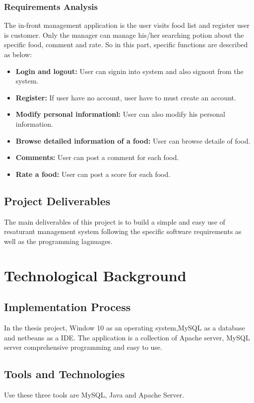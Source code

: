 \documentclass[12pt,a4paper]{article}
\newcommand\tab[1][1cm]{\hspace*{#1}}
\begin{document}
		\subsubsection{Requirements Analysis}
		\tab The in-front management application is the user visits food list and
register user is customer. Only the manager can manage his/her searching potion about the
specific food, comment and rate. So in this part, specific functions are described as
below:\\
			\begin{itemize}
				\item {\bfseries Login and logout:} User can signin into system and also signout from the system.
				\item {\bfseries Register:} If user have no account, user have to must create an account.
				\item {\bfseries Modify personal informationl:} User can also modify his personal information.
				\item {\bfseries Browse detailed information of a food:} User can browse detaile of food.
				\item {\bfseries Comments:} User can post a comment for each food.
				\item {\bfseries Rate a food:} User can post a score for each food.
			\end{itemize}
		\subsection{Project Deliverables}
	\tab The main deliverables of this project is to build a simple and easy use of resaturant management system following the specific software requirements as well as the programming lagnuages.
	


\newpage
\section{Technological Background}
	\subsection{Implementation Process}
	\tab In the thesis project, Window 10 as an operating system,MySQL as a database and netbeans as a IDE.
	The application is a collection of Apache server, MySQL server comprehensive programming and easy to use.
	\subsection{Tools and Technologies}
	\tab Use these three tools are MySQL\cite{Ref:5}, Java\cite{Ref:7} and Apache Server\cite{Ref:8}. 
\end{document}
